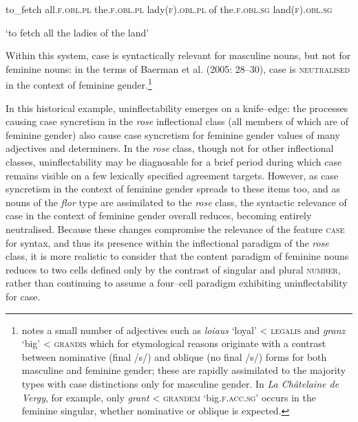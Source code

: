\documentclass[output=paper]{langscibook}
\begin{document}
to\_fetch  all.\textsc{f.obl.pl}   the.\textsc{f.obl.pl}   lady\textsc{(f).obl.pl}   of the.\textsc{f.obl.sg} land(\textsc{f).obl.sg}

‘to fetch all the ladies of the land’

Within this system, case is syntactically relevant for masculine nouns, but not for feminine nouns: in the terms of Baerman et al. (2005: 28–30), case is \textsc{neutralised} in the context of feminine gender.\footnote{\citet{Buridant2019} notes a small number of adjectives such as \textit{loiaus} ‘loyal’ < \textsc{legalis} and \textit{granz} ‘big’ < \textsc{grandis} which for etymological reasons originate with a contrast between nominative (final /s/) and oblique (no final /s/) forms for both masculine and feminine gender; these are rapidly assimilated to the majority types with case distinctions only for masculine gender. In \textit{La Châtelaine de Vergy}, for example, only \textit{grant} < \textsc{grandem} ‘big.\textsc{f.acc.sg}’ occurs in the feminine singular, whether nominative or oblique is expected.}

In this historical example, uninflectability emerges on a knife–edge: the processes causing case syncretism in the \textit{rose} inflectional class (all members of which are of feminine gender) also cause case syncretism for feminine gender values of many adjectives and determiners. In the \textit{rose} class, though not for other inflectional classes, uninflectability may be diagnosable for a brief period during which case remains visible on a few lexically specified agreement targets. However, as case syncretism in the context of feminine gender spreads to these items too, and as nouns of the \textit{flor} type are assimilated to the \textit{rose} class, the syntactic relevance of case in the context of feminine gender overall reduces, becoming entirely neutralised. Because these changes compromise the relevance of the feature \textsc{case} for syntax, and thus its presence within the inflectional paradigm of the \textit{rose} class, it is more realistic to consider that the content paradigm of feminine nouns reduces to two cells defined only by the contrast of singular and plural \textsc{number}, rather than continuing to assume a four–cell paradigm exhibiting uninflectability for case. 
\end{document}
